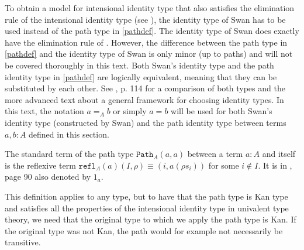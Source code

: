 \documentclass[12pt,a4paper,twoside,xetex]{book}
\newcommand{\op}[1]{\mathtt{#1}}
\begin{document}
To obtain a model for intensional identity type that also satisfies the elimination rule of the intensional identity type (see \label{pathindprop}), the identity type of Swan \cite{Swan2014} has to be used instead of the path type in \cref{pathdef}. The identity type of Swan does exactly have the elimination rule of \label{pathindprop}. However, the difference between the path type in \cref{pathdef} and the identity type of Swan is only minor (up to paths) and will not be covered thoroughly in this text. Both Swan's identity type and the path identity type in \cref{pathdef} are logically equivalent, meaning that they can be substituted by each other. See  \cite{Huber2016}, p. 114 for a comparison of both types and the more advanced text \cite{Swa18} about a general framework for choosing identity types. In this text, the notation $a =_A b$ or simply $a = b$ will be used for both Swan's identity type (constructed by Swan) and the path identity type between terms $a, b: A$ defined in this section. 

The standard term of the path type $\op{Path}_A(a,a)$ between a term $a : A$ and itself  is the reflexive term $\op{refl}_A(a)(I,\rho) \equiv (i, a(\rho s_i))$ for some $i \not \in I$. It is in \cite{Huber2016}, page 90 also denoted by $1_a$.

This definition applies to any type, but to have that the path type is Kan type and satisfies all the properties of the intensional identity type in univalent type theory, we need that the original type to which we apply the path type is Kan. If the original type was not Kan, the path would for example not necessarily be transitive. 
\end{document}

